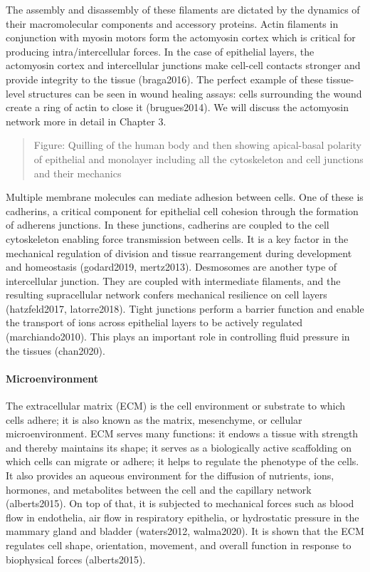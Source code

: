 \documentclass[
]{article}
\begin{document}
The assembly and disassembly of these filaments are dictated by the
dynamics of their macromolecular components and accessory proteins.
Actin filaments in conjunction with myosin motors form the actomyosin
cortex which is critical for producing intra/intercellular forces. In
the case of epithelial layers, the actomyosin cortex and intercellular
junctions make cell-cell contacts stronger and provide integrity to the
tissue (braga2016). The perfect example of these tissue-level structures
can be seen in wound healing assays: cells surrounding the wound create
a ring of actin to close it (brugues2014). We will discuss the
actomyosin network more in detail in Chapter 3.

\begin{quote}
Figure: Quilling of the human body and then showing apical-basal
polarity of epithelial and monolayer including all the cytoskeleton and
cell junctions and their mechanics
\end{quote}

Multiple membrane molecules can mediate adhesion between cells. One of
these is cadherins, a critical component for epithelial cell cohesion
through the formation of adherens junctions. In these junctions,
cadherins are coupled to the cell cytoskeleton enabling force
transmission between cells. It is a key factor in the mechanical
regulation of division and tissue rearrangement during development and
homeostasis (godard2019, mertz2013). Desmosomes are another type of
intercellular junction. They are coupled with intermediate filaments,
and the resulting supracellular network confers mechanical resilience on
cell layers (hatzfeld2017, latorre2018). Tight junctions perform a
barrier function and enable the transport of ions across epithelial
layers to be actively regulated (marchiando2010). This plays an
important role in controlling fluid pressure in the tissues (chan2020).

\hypertarget{microenvironment}{%
\paragraph{Microenvironment}\label{microenvironment}}

The extracellular matrix (ECM) is the cell environment or substrate to
which cells adhere; it is also known as the matrix, mesenchyme, or
cellular microenvironment. ECM serves many functions: it endows a tissue
with strength and thereby maintains its shape; it serves as a
biologically active scaffolding on which cells can migrate or adhere; it
helps to regulate the phenotype of the cells. It also provides an
aqueous environment for the diffusion of nutrients, ions, hormones, and
metabolites between the cell and the capillary network (alberts2015). On
top of that, it is subjected to mechanical forces such as blood flow in
endothelia, air flow in respiratory epithelia, or hydrostatic pressure
in the mammary gland and bladder (waters2012, walma2020). It is shown
that the ECM regulates cell shape, orientation, movement, and overall
function in response to biophysical forces (alberts2015).
\end{document}
